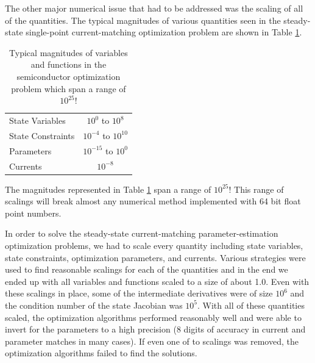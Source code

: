 \documentclass[pdf,ps2pdf,11pt]{SANDreport}
\begin{document}
{The other major numerical issue that had to be addressed was the scaling of
all of the quantities.  The typical magnitudes of various quantities seen in
the steady-state single-point current-matching optimization problem are shown
in Table {}\ref{table:SemiconductorMagnitudes}.
%
{\bsinglespace
\begin{table}
\caption[Typical magnitudes of quantities in
semiconductor optimization problem]{
\label{table:SemiconductorMagnitudes}
Typical magnitudes of variables and functions in the semiconductor
optimization problem which span a range of $10^{25}$!}
\begin{center}
\begin{tabular}{|l|c|}
\hline
State Variables &  $10^{0}$ to $10^{8}$ \\
State Constraints & $10^{-4}$ to $10^{10}$ \\
Parameters & $10^{-15}$ to $10^{0}$ \\
Currents & $10^{-8}$ \\
\hline
\end{tabular}
\end{center}
\end{table}
\esinglespace}
%
%
%
%
%
%
%
The magnitudes represented in Table {}\ref{table:SemiconductorMagnitudes} span
a range of $10^{25}$!  This range of scalings will break almost any numerical
method implemented with 64 bit float point numbers.

In order to solve the steady-state current-matching parameter-estimation
optimization problems, we had to scale every quantity including state
variables, state constraints, optimization parameters, and currents.  Various
strategies were used to find reasonable scalings for each of the quantities
and in the end we ended up with all variables and functions scaled to a size
of about 1.0.  Even with these scalings in place, some of the intermediate
derivatives were of size $10^{6}$ and the condition number of the state
Jacobian was $10^{5}$.  With all of these quantities scaled, the optimization
algorithms performed reasonably well and were able to invert for the
parameters to a high precision (8 digits of accuracy in current and parameter
matches in many cases).  If even one of to scalings was removed, the
optimization algorithms failed to find the solutions.

}
\end{document}
